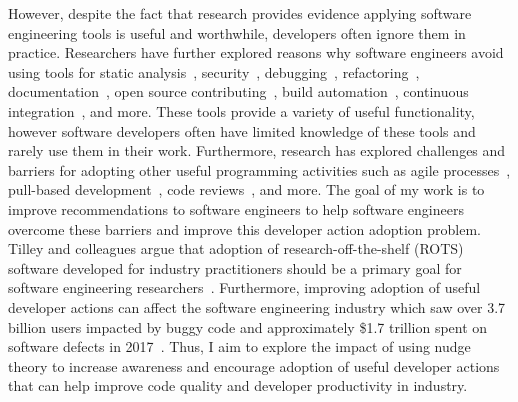 However, despite the fact that research provides evidence applying software engineering tools is useful and worthwhile, developers often ignore them in practice. Researchers have further explored reasons why software engineers avoid using tools for static analysis~\cite{Johnson2013Why}, security~\cite{Xiao2014Security},  debugging~\cite{Cao2010Debugging}, refactoring~\cite{Murphy-HillBarriersRefactoring}, documentation~\cite{Forward2002Documentation}, open source contributing~\cite{mendez2017open}, build automation~\cite{Akond2017BuildTools}, continuous integration~\cite{hilton2017CI}, and more. These tools provide a variety of useful functionality, however software developers often have limited knowledge of these tools and rarely use them in their work. Furthermore, research has explored challenges and barriers for adopting other useful programming activities such as agile processes~\cite{nerur2005challenges}, pull-based development~\cite{gousios2015work}, code reviews~\cite{bacchelli2013codereview}, and more. The goal of my work is to improve recommendations to software engineers to help software engineers overcome these barriers and improve this developer action adoption problem. Tilley and colleagues argue that adoption of research-off-the-shelf (ROTS) software developed for industry practitioners should be a primary goal for software engineering researchers~\cite{Tilley2003ROTS}. Furthermore, improving adoption of useful developer actions can affect the software engineering industry which saw over 3.7 billion users impacted by buggy code and approximately \$1.7 trillion spent on software defects in 2017~\cite{SoftwareFailWatch}. Thus, I aim to explore the impact of using nudge theory to increase awareness and encourage adoption of useful developer actions that can help improve code quality and developer productivity in industry.

 


